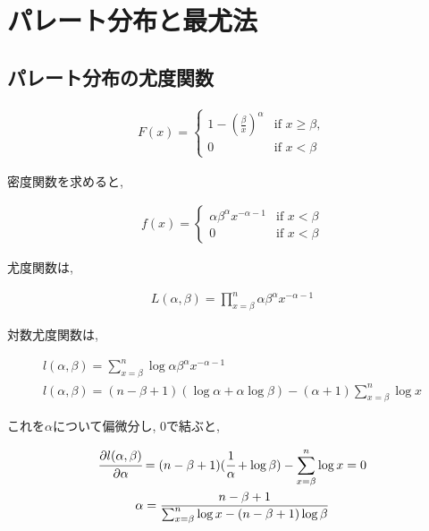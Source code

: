 \documentclass{article}
\begin{document}
\section{パレート分布と最尤法}

\subsection{パレート分布の尤度関数}

\begin{center}
	\begin{gather}
		F(x) = \begin{cases} 
			1 - \left( \frac{\beta}{x} \right)^\alpha & \text{if } x \geq \beta, \\
			0 & \text{if } x < \beta 
		\end{cases}
	\end{gather}
\end{center}

密度関数を求めると,

\begin{center}
	\begin{gather}
		f(x) = \begin{cases} 
			\alpha\beta^\alpha x^{-\alpha-1} & \text{if } x < \beta \\
			0 & \text{if } x < \beta 
		\end{cases}
	\end{gather}
\end{center}

尤度関数は,

\begin{center}
	\begin{gather}
		L(\alpha, \beta) = \prod_{x = \beta}^{n} \alpha\beta^\alpha x^{-\alpha-1}
	\end{gather}
\end{center}

対数尤度関数は,

\begin{center}
	\begin{gather}
		l(\alpha, \beta) = \sum_{x = \beta}^{n} \log\alpha\beta^\alpha x^{-\alpha-1} \\
		l(\alpha, \beta) = (n - \beta + 1)(\log\alpha + \alpha\log\beta) - (\alpha + 1)\sum_{x = \beta}^{n} \log x
	\end{gather}
\end{center}

これを$\alpha$について偏微分し, 0で結ぶと,

\begin{center}
	\begin{gather}
		\cfrac{\partial l(\alpha, \beta)}{\partial \alpha} = (n - \beta + 1)(\cfrac{1}{\alpha} + \log\beta) - \sum_{x = \beta}^{n} \log x = 0 \\
		\alpha = \dfrac{n -\beta + 1}{\sum_{x = \beta}^{n} \log x - (n - \beta + 1)\log \beta}
	\end{gather}
\end{center}
\end{document}
